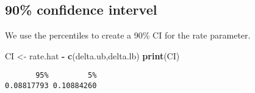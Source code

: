 \documentclass[]{book}
\newenvironment{Shaded}{\begin{snugshade}}{\end{snugshade}}
\newcommand{\KeywordTok}[1]{\textcolor[rgb]{0.13,0.29,0.53}{\textbf{#1}}}
\newcommand{\StringTok}[1]{\textcolor[rgb]{0.31,0.60,0.02}{#1}}
\newcommand{\OperatorTok}[1]{\textcolor[rgb]{0.81,0.36,0.00}{\textbf{#1}}}
\newcommand{\NormalTok}[1]{#1}
\theoremstyle{definition}
\theoremstyle{definition}
\theoremstyle{definition}
\theoremstyle{remark}
\begin{document}
\subsection{90\% confidence intervel}\label{confidence-intervel}

We use the percentiles to create a 90\% CI for the rate parameter.

\begin{Shaded}
\begin{Highlighting}[]
\NormalTok{CI <-}\StringTok{ }\NormalTok{rate.hat }\OperatorTok{-}\StringTok{ }\KeywordTok{c}\NormalTok{(delta.ub,delta.lb)}
\KeywordTok{print}\NormalTok{(CI)}
\end{Highlighting}
\end{Shaded}

\begin{verbatim}
       95%         5% 
0.08817793 0.10884260 
\end{verbatim}


\end{document}
